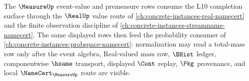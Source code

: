 The $\MeasureUp$ event-value and premeasure rows consume the L10 completion surface through the $\RealUp$ value route of \autoref{ch:concrete-instances-real-namecert} and the finite observation discipline of \autoref{ch:concrete-instances-streamname-namecert}. The same displayed rows then feed the probability consumer of \autoref{ch:concrete-instances-probspace-namecert}: normalization may read a total-mass row only after the event algebra, Real-valued mass row, $\BHist$ ledger, componentwise $\hsame$ transport, displayed $\Cont$ replay, $\Pkg$ provenance, and local $\NameCert_{\MeasureUp}$ route are visible.
